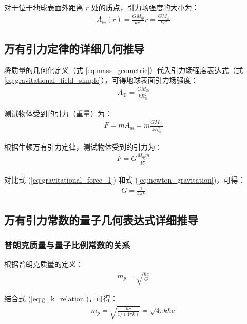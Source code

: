 \documentclass[12pt,twocolumn]{article}
\begin{document}
对于位于地球表面外距离 $r$ 处的质点，引力场强度的大小为：
\begin{align}
    A_\oplus(r) = \frac{G M_\oplus}{k r^3} r = \frac{G M_\oplus}{k r^2}
    \label{eq:gravitational_field_magnitude}
\end{align}

\subsection{万有引力定律的详细几何推导}

将质量的几何化定义（式 \ref{eq:mass_geometric}）代入引力场强度表达式（式 \ref{eq:gravitational_field_simple}），可得地球表面引力场强度：
\begin{align}
    A_\oplus = \frac{G M_\oplus}{k R_\oplus^2}
    \label{eq:earth_gravitational_field}
\end{align}

测试物体受到的引力（重量）为：
\begin{align}
    F = m A_\oplus = m \frac{G M_\oplus}{k R_\oplus^2}
    \label{eq:gravitational_force_1}
\end{align}

根据牛顿万有引力定律，测试物体受到的引力为：
\begin{align}
    F = G \frac{M_\oplus m}{R_\oplus^2}
    \label{eq:newton_gravitation}
\end{align}

对比式 (\ref{eq:gravitational_force_1}) 和式 (\ref{eq:newton_gravitation})，可得：
\begin{align}
    G = \frac{1}{4\pi k}
    \label{eq:g_k_relation}
\end{align}

\subsection{万有引力常数的量子几何表达式详细推导}

\subsubsection{普朗克质量与量子比例常数的关系}

根据普朗克质量的定义：
\begin{align}
    m_p = \sqrt{\frac{\hbar c}{G}}
    \label{eq:planck_mass_def}
\end{align}

结合式 (\ref{eq:g_k_relation})，可得：
\begin{align}
    m_p = \sqrt{\frac{\hbar c}{1/(4\pi k)}} = \sqrt{4\pi k \hbar c}
    \label{eq:planck_mass_k_1}
\end{align}
\end{document}
